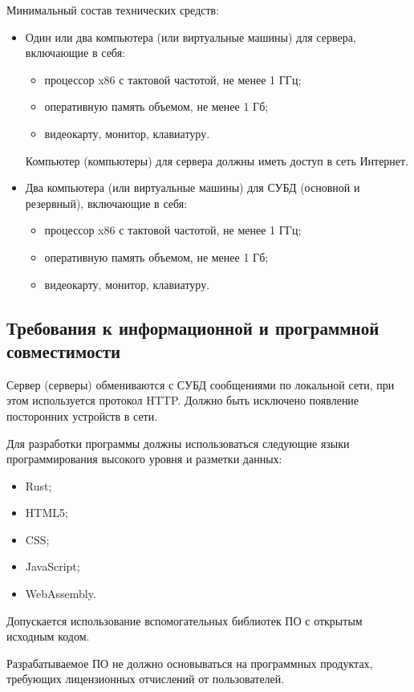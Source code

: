 \documentclass[a4page]{article}
\begin{document}
Минимальный состав технических средств: 

\begin{itemize}
  \item Один или два компьютера (или виртуальные машины) для сервера, включающие в себя:
    \begin{itemize}
      \item процессор x86 с тактовой частотой, не менее 1 ГГц;
      \item оперативную память объемом, не менее 1 Гб;
      \item видеокарту, монитор, клавиатуру.
    \end{itemize}
    Компьютер (компьютеры) для сервера должны иметь доступ в сеть Интернет.
  \item Два компьютера (или виртуальные машины) для СУБД (основной и резервный), включающие в себя: 
    \begin{itemize}
      \item процессор x86 с тактовой частотой, не менее 1 ГГц;
      \item оперативную память объемом, не менее 1 Гб;
      \item видеокарту, монитор, клавиатуру.
    \end{itemize}
\end{itemize}

\subsection{Требования к информационной и программной совместимости}

Сервер (серверы) обмениваются с СУБД сообщениями по локальной сети, при этом используется протокол HTTP. Должно быть исключено появление посторонних устройств в сети.

Для разработки программы должны использоваться следующие языки программирования высокого уровня и разметки данных:

\begin{itemize}
  \item Rust;
  \item HTML5;
  \item CSS;
  \item JavaScript;
  \item WebAssembly.
\end{itemize}

Допускается использование вспомогательных библиотек ПО с открытым исходным кодом.

Разрабатываемое ПО не должно основываться на программных продуктах, требующих лицензионных отчислений от пользователей.
\end{document}
